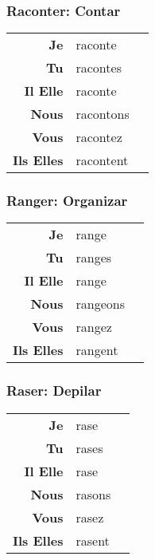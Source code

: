 \documentclass{subfiles}
\begin{document}
\begin{multicols*}{3}
        \subsubsection{Raconter: Contar}
            \begin{tabular}{r l r}
                \textbf{Je}        & raconte   &\\
                \textbf{Tu}        & racontes  &\\
                \textbf{Il Elle}   & raconte   &\\
                \textbf{Nous}      & racontons &\\
                \textbf{Vous}      & racontez  &\\
                \textbf{Ils Elles} & racontent &
            \end{tabular}

        \subsubsection{Ranger: Organizar}
            \begin{tabular}{r l r}
                \textbf{Je}        & range    &\\
                \textbf{Tu}        & ranges   &\\
                \textbf{Il Elle}   & range    &\\
                \textbf{Nous}      & rangeons &\\
                \textbf{Vous}      & rangez   &\\
                \textbf{Ils Elles} & rangent  &
            \end{tabular}

        \subsubsection{Raser: Depilar}
            \begin{tabular}{r l r}
                \textbf{Je}        & rase   &\\
                \textbf{Tu}        & rases  &\\
                \textbf{Il Elle}   & rase   &\\
                \textbf{Nous}      & rasons &\\
                \textbf{Vous}      & rasez  &\\
                \textbf{Ils Elles} & rasent &
            \end{tabular}


\end{multicols*}
\end{document}
